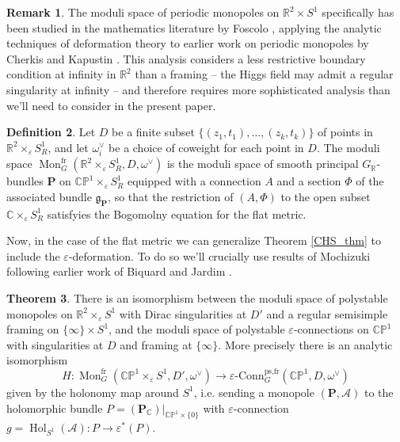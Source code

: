 \documentclass[11pt, oneside, reqno]{amsart}
\theoremstyle{definition} \newtheorem{definition}{Definition}[section]
\newtheorem{theorem}[definition]{Theorem}
\theoremstyle{definition} \newtheorem{remark}[definition]{Remark}
\theoremstyle{definition} \newtheorem{remarks}[definition]{Remarks}
\theoremstyle{definition} \newtheorem{question}[definition]{Question}
\theoremstyle{definition} \newtheorem*{note}{Note}
\theoremstyle{definition} \newtheorem{example}[definition]{Example}
\theoremstyle{definition} \newtheorem{examples}[definition]{Examples}
\renewcommand{\gg}{\mathfrak{g}}
\newcommand{\bb}[1]{\mathbb{#1}}
\newcommand{\mc}[1]{\mathcal{#1}}
\newcommand{\bo}[1]{\boldsymbol{#1}}
\newcommand{\CC}{\mathbb{C}}
\newcommand{\RR}{\mathbb{R}}
\newcommand{\eps}{\varepsilon}
\DeclareMathOperator{\mon}{Mon}
\DeclareMathOperator{\Hol}{Hol}
\newcommand{\epsconn}{\varepsilon\text{-Conn}}
\newcommand{\fr}{\mathrm{fr}}
\begin{document}
\begin{remark}
The moduli space of periodic monopoles on $\RR^2 \times S^1$ specifically has been studied in the mathematics literature by Foscolo \cite{FoscoloDef} , applying the analytic techniques of deformation theory to earlier work on periodic monopoles by Cherkis and Kapustin \cite{CherkisKapustin1, CherkisKapustin2}. This analysis considers a less restrictive boundary condition at infinity in $\RR^2$ than a framing -- the Higgs field may admit a regular singularity at infinity -- and therefore requires more sophisticated analysis than we'll need to consider in the present paper.
\end{remark}

\begin{definition} \label{monopole_moduli_def}
Let $D$ be a finite subset $\{(z_1,t_1), \ldots, (z_k, t_k)\}$ of points in $\RR^2 \times_\eps S^1_R$, and let $\omega^\vee_{i}$ be a choice of coweight for each point in $D$. The moduli space $\mon^\fr_G(\RR^2 \times_\eps S^1_R, D, \omega^\vee)$ is the moduli space of smooth principal $G_\RR$-bundles $\bo P$ on $\bb{CP}^1 \times_\eps S^1_R$ equipped with a connection $A$ and a section $\Phi$ of the associated bundle $\gg_{\bo P}$, so that the restriction of $(A,\Phi)$ to the open subset $\CC \times_\eps S^1_R$ satisfyies the Bogomolny equation for the flat metric.
\end{definition}

Now, in the case of the flat metric we can generalize Theorem \ref{CHS_thm} to include the $\eps$-deformation.  To do so we'll crucially use results of Mochizuki \cite{MochizukiKH} following earlier work of Biquard and Jardim \cite{BiquardJardim}.

\begin{theorem} \label{monopole_qconn_comparison_thm}
There is an isomorphism between the moduli space of polystable monopoles on $\RR^2 \times_\eps S^1$ with Dirac singularities at $D'$ and a regular semisimple framing on $\{\infty\} \times S^1$, and the moduli space of polystable $\eps$-connections on $\bb{CP}^1$ with singularities at $D$ and framing at $\{\infty\}$.  More precisely there is an analytic isomorphism
\[H \colon \mon^{\fr}_G(\bb{CP}^1 \times_\eps S^1, D', \omega^\vee) \to \epsconn_G^{\text{ps,fr}}(\bb{CP}^1, D, \omega^\vee)\]
given by the holonomy map around $S^1$, i.e. sending a monopole $(\bo P, \mc A)$ to the holomorphic bundle $P = (\bo P_\CC)|_{\bb{CP}^1 \times \{0\}}$ with $\eps$-connection $g = \Hol_{S^1}(\mc A) \colon P \to \eps^*(P)$.
\end{theorem}
\end{document}
